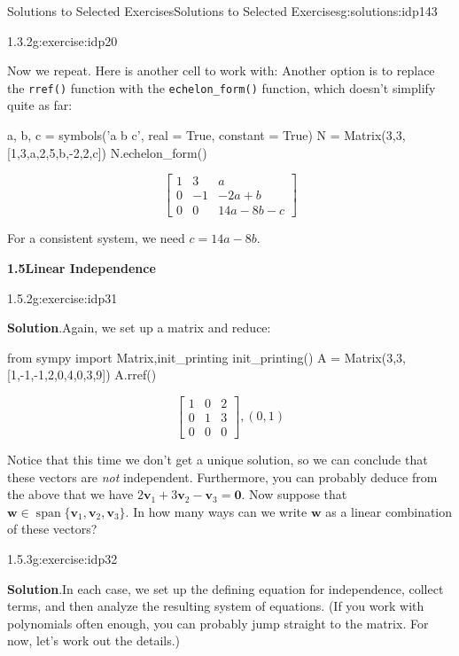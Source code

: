 \documentclass[oneside,10pt,]{book}
\newcommand{\blocktitlefont}{\relax}
\newcommand{\mono}[1]{\texttt{#1}}
\numberwithin{equation}{section}
\newcommand{\spn}{\operatorname{span}}
\newcommand{\bbm}{\begin{bmatrix}}
\newcommand{\ebm}{\end{bmatrix}}
\newcommand{\vv}{\mathbf{v}}
\newcommand{\ww}{\mathbf{w}}
\newcommand{\amp}{&}
\begin{document}
\begin{solutions-chapter}{Solutions to Selected Exercises}{}{Solutions to Selected Exercises}{}{}{g:solutions:idp143}
\begin{inlinesolution}{1.3.2}{}{g:exercise:idp20}
\par
Now we repeat. Here is another cell to work with:%
Another option is to replace the \mono{rref()} function with the \mono{echelon\_form()} function, which doesn't simplify quite as far:%
\begin{sageinput}
a, b, c = symbols('a b c', real = True, constant = True)
N = Matrix(3,3,[1,3,a,2,5,b,-2,2,c])
N.echelon_form()
\end{sageinput}
\begin{sageoutput}
\[\bbm 1\amp 3\amp a\\0\amp -1\amp -2a+b\\0\amp 0\amp 14a-8b-c\ebm\]
\end{sageoutput}
For a consistent system, we need \(c=14a-8b\).%
\end{inlinesolution}%
\par\medskip
\noindent\textbf{\Large{}1.5\space\textperiodcentered\space{}Linear Independence}
\begin{inlinesolution}{1.5.2}{}{g:exercise:idp31}%
\par\smallskip%
\noindent\textbf{\blocktitlefont Solution}.\hypertarget{g:solution:idp147-back}{}\quad{}Again, we set up a matrix and reduce:%
\begin{sageinput}
from sympy import Matrix,init_printing
init_printing()
A = Matrix(3,3,[1,-1,-1,2,0,4,0,3,9])
A.rref()
\end{sageinput}
\begin{sageoutput}
\[\bbm 1\amp 0\amp 2\\0\amp 1\amp 3\\0\amp 0\amp 0\ebm, (0,1)\]
\end{sageoutput}
Notice that this time we don't get a unique solution, so we can conclude that these vectors are \emph{not} independent. Furthermore, you can probably deduce from the above that we have \(2\vv_1+3\vv_2-\vv_3=\mathbf{0}\). Now suppose that \(\ww\in\spn\{\vv_1,\vv_2,\vv_3\}\). In how many ways can we write \(\ww\) as a linear combination of these vectors?%
\end{inlinesolution}%
\begin{inlinesolution}{1.5.3}{}{g:exercise:idp32}%
\par\smallskip%
\noindent\textbf{\blocktitlefont Solution}.\hypertarget{g:solution:idp148-back}{}\quad{}In each case, we set up the defining equation for independence, collect terms, and then analyze the resulting system of equations. (If you work with polynomials often enough, you can probably jump straight to the matrix. For now, let's work out the details.)%

\end{inlinesolution}
\end{solutions-chapter}
\end{document}
